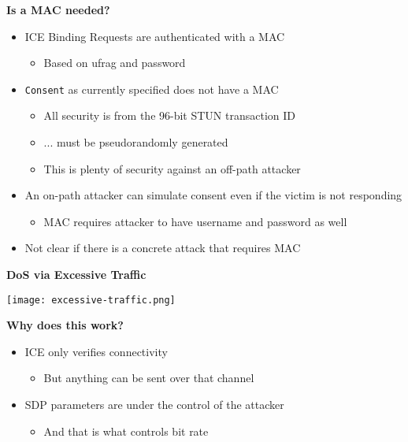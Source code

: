 \documentclass[helvetica]{seminar}
\newcommand{\heading}[1]{%
  \begin{center} 
    \large\bf 
    #1 
  \end{center} 
  \vspace{.4 in}}
\begin{document}
\begin{slide}
\heading{Is a MAC needed?}

\begin{itemize}
\item ICE Binding Requests are authenticated with a MAC
  \begin{itemize}
  \item Based on ufrag and password
  \end{itemize}

\item \verb^Consent^ as currently specified does not have a MAC
  \begin{itemize}
  \item All security is from the 96-bit STUN transaction ID
  \item ... must be pseudorandomly generated
  \item This is plenty of security against an off-path attacker
  \end{itemize}

\item An on-path attacker can simulate consent even if the victim is not responding
  \begin{itemize}
  \item MAC requires attacker to have username and password as well
  \end{itemize}

\item Not clear if there is a concrete attack that requires MAC
\end{itemize}
\end{slide}


\begin{slide}
\heading{DoS via Excessive Traffic}

{\centering
\noindent\texttt{[image: excessive-traffic.png]}
}
\end{slide}






\begin{slide}
\heading{Why does this work?}

\begin{itemize}
\item ICE only verifies connectivity
  \begin{itemize}
  \item But anything can be sent over that channel
  \end{itemize}


\item SDP parameters are under the control of the attacker
  \begin{itemize}
  \item And that is what controls bit rate
  \end{itemize}
\end{itemize}
\end{slide}
\end{document}
